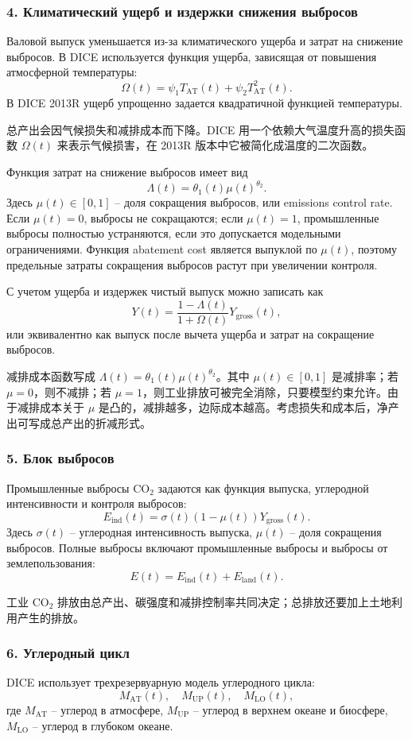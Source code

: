 \documentclass[12pt,a4paper]{article}
\newcommand{\zh}[1]{\par\noindent #1\par}
\begin{document}
\subsubsection*{4. Климатический ущерб и издержки снижения выбросов}
Валовой выпуск уменьшается из-за климатического ущерба и затрат на снижение выбросов. В DICE используется функция ущерба, зависящая от повышения атмосферной температуры:
\[
\Omega(t)=\psi_1T_{\mathrm{AT}}(t)+\psi_2T_{\mathrm{AT}}^2(t).
\]
В DICE 2013R ущерб упрощенно задается квадратичной функцией температуры.
\zh{总产出会因气候损失和减排成本而下降。DICE 用一个依赖大气温度升高的损失函数 \(\Omega(t)\) 来表示气候损害，在 2013R 版本中它被简化成温度的二次函数。}

Функция затрат на снижение выбросов имеет вид
\[
\Lambda(t)=\theta_1(t)\mu(t)^{\theta_2}.
\]
Здесь $\mu(t)\in[0,1]$ -- доля сокращения выбросов, или emissions control rate. Если $\mu(t)=0$, выбросы не сокращаются; если $\mu(t)=1$, промышленные выбросы полностью устраняются, если это допускается модельными ограничениями. Функция abatement cost является выпуклой по $\mu(t)$, поэтому предельные затраты сокращения выбросов растут при увеличении контроля.

С учетом ущерба и издержек чистый выпуск можно записать как
\[
Y(t)=\frac{1-\Lambda(t)}{1+\Omega(t)}Y_{\mathrm{gross}}(t),
\]
или эквивалентно как выпуск после вычета ущерба и затрат на сокращение выбросов.
\zh{减排成本函数写成 \(\Lambda(t)=\theta_1(t)\mu(t)^{\theta_2}\)。其中 \(\mu(t)\in[0,1]\) 是减排率；若 \(\mu=0\)，则不减排；若 \(\mu=1\)，则工业排放可被完全消除，只要模型约束允许。由于减排成本关于 \(\mu\) 是凸的，减排越多，边际成本越高。考虑损失和成本后，净产出可写成总产出的折减形式。}

\subsubsection*{5. Блок выбросов}
Промышленные выбросы CO$_2$ задаются как функция выпуска, углеродной интенсивности и контроля выбросов:
\[
E_{\mathrm{ind}}(t)=\sigma(t)(1-\mu(t))Y_{\mathrm{gross}}(t).
\]
Здесь $\sigma(t)$ -- углеродная интенсивность выпуска, $\mu(t)$ -- доля сокращения выбросов. Полные выбросы включают промышленные выбросы и выбросы от землепользования:
\[
E(t)=E_{\mathrm{ind}}(t)+E_{\mathrm{land}}(t).
\]
\zh{工业 CO$_2$ 排放由总产出、碳强度和减排控制率共同决定；总排放还要加上土地利用产生的排放。}

\subsubsection*{6. Углеродный цикл}
DICE использует трехрезервуарную модель углеродного цикла:
\[
M_{\mathrm{AT}}(t),\quad M_{\mathrm{UP}}(t),\quad M_{\mathrm{LO}}(t),
\]
где $M_{\mathrm{AT}}$ -- углерод в атмосфере, $M_{\mathrm{UP}}$ -- углерод в верхнем океане и биосфере, $M_{\mathrm{LO}}$ -- углерод в глубоком океане.
\end{document}
